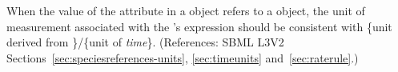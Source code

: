 When the value of the attribute  in a \RateRule object
refers to a \SpeciesReference object, the unit of measurement associated
with the \RateRule's  expression should be consistent with
\{unit derived from \}/\{unit of \emph{time}\}.
(References: SBML L3V2 Sections~\ref{sec:speciesreferences-units},
\ref{sec:timeunits} and~\ref{sec:raterule}.)
